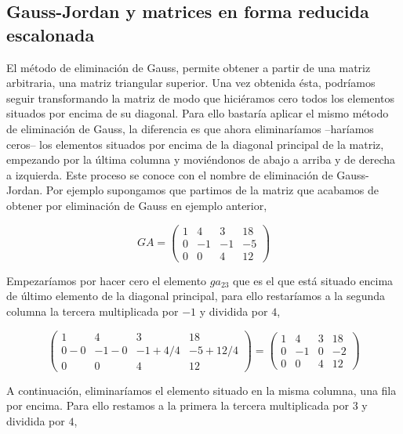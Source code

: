 \subsection{Gauss-Jordan  y matrices en forma reducida escalonada}
El método de eliminación de Gauss, permite obtener a partir de una matriz arbitraria, una  matriz triangular superior. Una vez obtenida ésta, podríamos seguir transformando la matriz de modo que hiciéramos cero todos los elementos situados por encima de su diagonal. Para ello bastaría aplicar el mismo método de eliminación de Gauss, la diferencia es que ahora eliminaríamos --haríamos ceros-- los elementos situados por encima de la diagonal principal de la matriz, empezando por la última columna y moviéndonos de abajo a arriba y de derecha a izquierda. Este proceso se conoce con el nombre de eliminación de Gauss-Jordan.
Por ejemplo supongamos que partimos de la matriz que acabamos de obtener por eliminación de Gauss en ejemplo anterior,

\begin{equation*}
GA=\begin{pmatrix}
1&     4&     3&    18\\
 0&    -1&    -1&    -5\\
 0&     0&     4&    12
\end{pmatrix}
\end{equation*}  

Empezaríamos por hacer cero el elemento $ga_{23}$ que es el que está situado encima de último elemento de la diagonal principal, para ello restaríamos a la segunda columna la tercera multiplicada por $-1$ y dividida por $4$,

\begin{equation*}
\begin{pmatrix}
1&     4&     3&    18\\
 0-0&    -1-0&    -1+4/4&    -5+12/4\\
 0&     0&     4&    12
\end{pmatrix}=\begin{pmatrix}
1&     4&     3&    18\\
 0&    -1&    0&    -2\\
 0&     0&     4&    12
 \end{pmatrix}
\end{equation*}  

A continuación, eliminaríamos el elemento situado en la misma columna, una fila por encima. Para ello restamos a la primera la tercera multiplicada por $3$ y dividida por $4$,

